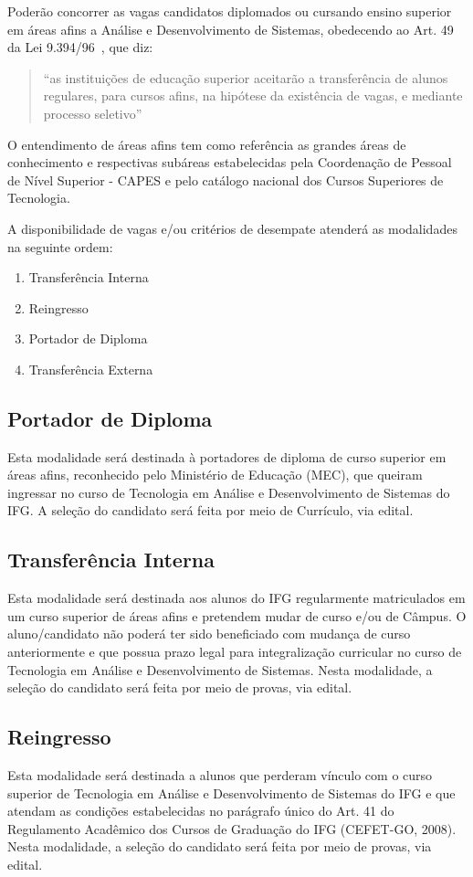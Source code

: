 \documentclass[
	10pt,				%
	openright,			%
	twoside,			%
	a4paper,			%
	english,			%
	french,				%
	brazil,				%
	sumario=tradicional
]{abntex2}
\begin{document}
Poderão concorrer as vagas candidatos diplomados ou cursando ensino superior em áreas afins a Análise e Desenvolvimento de Sistemas, obedecendo ao Art. 49 da Lei 9.394/96~\cite{Lei19394De1996}, que diz: 
\begin{quote}
	``as instituições de educação superior aceitarão a transferência de alunos regulares, para cursos afins, na hipótese da
	existência de vagas, e mediante processo seletivo''~\cite{Lei19394De1996}
\end{quote}

O entendimento de áreas afins tem como referência as grandes áreas de conhecimento e respectivas subáreas estabelecidas pela Coordenação de Pessoal de Nível Superior - CAPES e pelo catálogo nacional dos Cursos Superiores de Tecnologia.

A disponibilidade de vagas e/ou critérios de desempate atenderá as modalidades na seguinte ordem:
\begin{enumerate}
	\item Transferência Interna
	\item Reingresso
	\item Portador de Diploma
	\item Transferência Externa
\end{enumerate}

\subsection*{Portador de Diploma}
Esta modalidade será destinada à portadores de diploma de curso superior em áreas afins, reconhecido pelo Ministério de Educação (MEC), que queiram ingressar no curso de Tecnologia em Análise e Desenvolvimento de Sistemas do IFG. A seleção do candidato será feita por meio de Currículo, via edital.

\subsection*{Transferência Interna}
Esta modalidade será destinada aos alunos do IFG regularmente matriculados em um curso superior de áreas afins e pretendem mudar de curso e/ou de Câmpus. O aluno/candidato não poderá ter sido beneficiado com mudança de curso anteriormente e que possua prazo legal para integralização curricular no curso de Tecnologia em Análise e Desenvolvimento de Sistemas. Nesta modalidade, a seleção do candidato será feita por meio de provas, via edital.

\subsection*{Reingresso}
Esta modalidade será destinada a alunos que perderam vínculo com o curso superior de Tecnologia em Análise e Desenvolvimento de Sistemas do IFG e que atendam as condições estabelecidas no parágrafo único do Art. 41 do Regulamento Acadêmico dos Cursos de Graduação do IFG (CEFET-GO, 2008).
Nesta modalidade, a seleção do candidato será feita por meio de provas, via edital.
\end{document}
